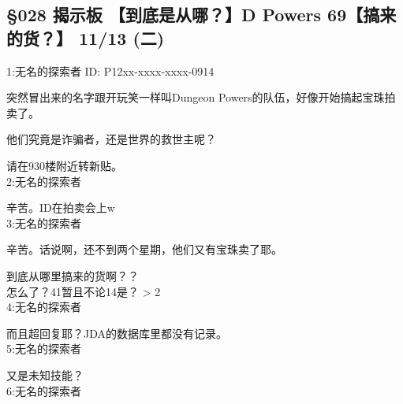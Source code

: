 \subsection{§028 揭示板 【到底是从哪？】D Powers 69【搞来的货？】 11/13 (二)}

1:无名的探索者 ID: P12xx-xxxx-xxxx-0914

突然冒出来的名字跟开玩笑一样叫Dungeon Powers的队伍，好像开始搞起宝珠拍卖了。

他们究竟是诈骗者，还是世界的救世主呢？

请在930楼附近转新贴。\\

2:无名的探索者

辛苦。ID在拍卖会上w\\

3:无名的探索者

辛苦。话说啊，还不到两个星期，他们又有宝珠卖了耶。

到底从哪里搞来的货啊？？\\

怎么了？41暂且不论14是？ > 2\\

4:无名的探索者

而且超回复耶？JDA的数据库里都没有记录。\\

5:无名的探索者

又是未知技能？\\

6:无名的探索者

